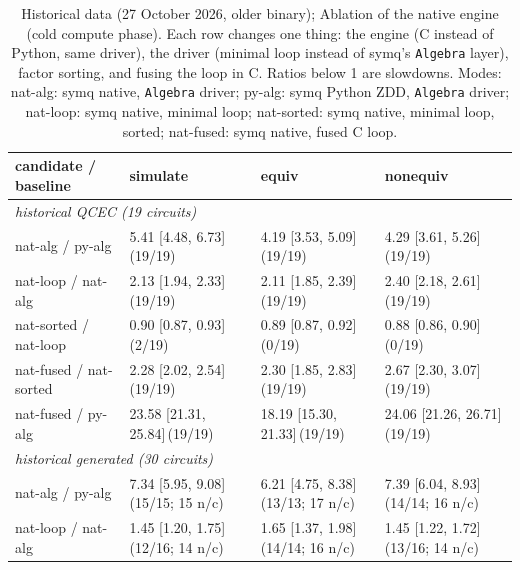 \begin{table}[t]
\centering\scriptsize
\setlength{\tabcolsep}{4pt}
\caption{Historical data (27 October 2026, older binary); Ablation of the native engine (cold compute phase). Each row changes one thing: the engine (C instead of Python, same driver), the driver (minimal loop instead of symq's \texttt{Algebra} layer), factor sorting, and fusing the loop in C. Ratios below 1 are slowdowns. Modes: \textsf{nat-alg}: symq native, \texttt{Algebra} driver; \textsf{py-alg}: symq Python ZDD, \texttt{Algebra} driver; \textsf{nat-loop}: symq native, minimal loop; \textsf{nat-sorted}: symq native, minimal loop, sorted; \textsf{nat-fused}: symq native, fused C loop.}
\label{tab:ablation}
\begin{tabular}{llll}
\toprule
candidate / baseline & simulate & equiv & nonequiv \\
\midrule
\multicolumn{4}{l}{\emph{historical QCEC (19 circuits)}} \\
\textsf{nat-alg} / \textsf{py-alg} & 5.41 [4.48, 6.73]\,{\scriptsize(19/19)} & 4.19 [3.53, 5.09]\,{\scriptsize(19/19)} & 4.29 [3.61, 5.26]\,{\scriptsize(19/19)} \\
\textsf{nat-loop} / \textsf{nat-alg} & 2.13 [1.94, 2.33]\,{\scriptsize(19/19)} & 2.11 [1.85, 2.39]\,{\scriptsize(19/19)} & 2.40 [2.18, 2.61]\,{\scriptsize(19/19)} \\
\textsf{nat-sorted} / \textsf{nat-loop} & 0.90 [0.87, 0.93]\,{\scriptsize(2/19)} & 0.89 [0.87, 0.92]\,{\scriptsize(0/19)} & 0.88 [0.86, 0.90]\,{\scriptsize(0/19)} \\
\textsf{nat-fused} / \textsf{nat-sorted} & 2.28 [2.02, 2.54]\,{\scriptsize(19/19)} & 2.30 [1.85, 2.83]\,{\scriptsize(19/19)} & 2.67 [2.30, 3.07]\,{\scriptsize(19/19)} \\
\textsf{nat-fused} / \textsf{py-alg} & 23.58 [21.31, 25.84]\,{\scriptsize(19/19)} & 18.19 [15.30, 21.33]\,{\scriptsize(19/19)} & 24.06 [21.26, 26.71]\,{\scriptsize(19/19)} \\
\midrule
\multicolumn{4}{l}{\emph{historical generated (30 circuits)}} \\
\textsf{nat-alg} / \textsf{py-alg} & 7.34 [5.95, 9.08]\,{\scriptsize(15/15; 15 n/c)} & 6.21 [4.75, 8.38]\,{\scriptsize(13/13; 17 n/c)} & 7.39 [6.04, 8.93]\,{\scriptsize(14/14; 16 n/c)} \\
\textsf{nat-loop} / \textsf{nat-alg} & 1.45 [1.20, 1.75]\,{\scriptsize(12/16; 14 n/c)} & 1.65 [1.37, 1.98]\,{\scriptsize(14/14; 16 n/c)} & 1.45 [1.22, 1.72]\,{\scriptsize(13/16; 14 n/c)} \\

\end{tabular}
\end{table}
